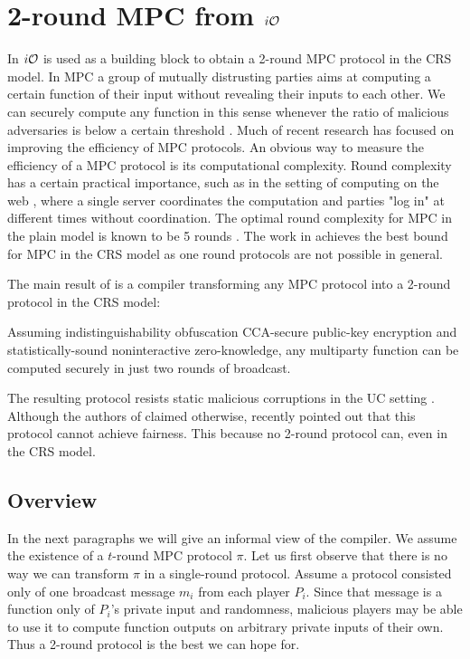 \section{2-round MPC from $i\mathcal{O}$}
\label{sec:iO-mpc}

In \cite{MPC-iO} $i\mathcal{O}$ is used as a building block to obtain a 2-round MPC protocol in the CRS model. In MPC a group of mutually distrusting parties aims at computing a certain function of their input without revealing their inputs to each other. We can securely compute any function in this sense whenever the ratio of malicious adversaries is below a certain threshold \cite{yao1982protocols,goldreich1987play}.
Much of recent research has focused on improving the efficiency of MPC protocols. An obvious way to measure the efficiency of a MPC protocol is its computational complexity. Round complexity has a certain practical importance, such as in the setting of computing on the web \cite{halevi2011secure}, 
where a single server coordinates the computation and parties "log in" at different times without coordination.
The optimal round complexity for MPC in the plain model is known to be 5 rounds \cite{katz2004round}. The work in \cite{MPC-iO} achieves the best bound for MPC in the CRS model as one round protocols are not possible in general.

The main result of \cite{MPC-iO} is a compiler transforming any MPC protocol into a 2-round protocol in the CRS model: %
\begin{myinformaltheorem}
	Assuming indistinguishability obfuscation CCA-secure public-key encryption and statistically-sound noninteractive zero-knowledge, any multiparty function can be computed securely in just two rounds of broadcast.
\end{myinformaltheorem}


The resulting protocol resists static malicious corruptions in the UC setting \cite{canetti2001universally}.
Although the authors of \cite{MPC-iO} claimed otherwise, \cite{gordon2015constant} recently pointed out that this protocol cannot achieve fairness. This because no 2-round protocol can, even in the CRS model.

\subsection{Overview}
In the next paragraphs we will give an informal view of the compiler.
We assume the existence of a $t$-round MPC protocol $\pi$. %
Let us first observe  that there is no way we can transform $\pi$ in a single-round protocol. Assume a protocol consisted only of one broadcast message $m_i$ from each player $P_i$. Since that message is a function only of $P_i$'s private input and randomness, malicious players may be able to use it to compute function outputs on arbitrary private inputs of their own. Thus a 2-round protocol is the best we can hope for.


